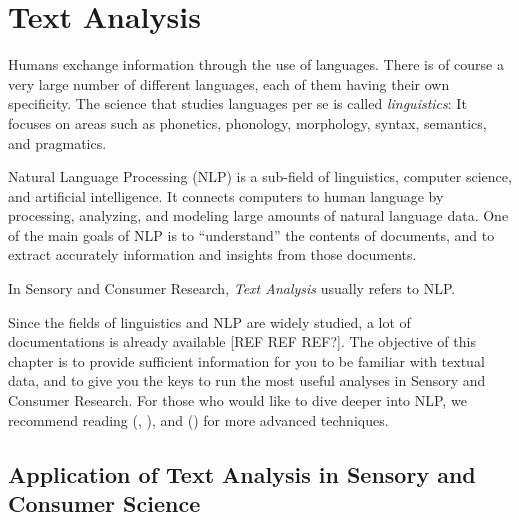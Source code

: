 \documentclass[
]{book}
\newenvironment{Shaded}{\begin{snugshade}}{\end{snugshade}}
\newcommand{\AttributeTok}[1]{\textcolor[rgb]{0.77,0.63,0.00}{#1}}
\newcommand{\CommentTok}[1]{\textcolor[rgb]{0.56,0.35,0.01}{\textit{#1}}}
\newcommand{\DecValTok}[1]{\textcolor[rgb]{0.00,0.00,0.81}{#1}}
\newcommand{\FunctionTok}[1]{\textcolor[rgb]{0.00,0.00,0.00}{#1}}
\newcommand{\NormalTok}[1]{#1}
\newcommand{\OtherTok}[1]{\textcolor[rgb]{0.56,0.35,0.01}{#1}}
\newcommand{\SpecialCharTok}[1]{\textcolor[rgb]{0.00,0.00,0.00}{#1}}
\newcommand{\StringTok}[1]{\textcolor[rgb]{0.31,0.60,0.02}{#1}}
\begin{document}
\begin{Shaded}
\end{Shaded}

\hypertarget{text-analysis}{%
\chapter{Text Analysis}\label{text-analysis}}

Humans exchange information through the use of languages. There is of course a very large number of different languages, each of them having their own specificity. The science that studies languages per se is called \emph{linguistics}: It focuses on areas such as phonetics, phonology, morphology, syntax, semantics, and pragmatics.

Natural Language Processing (NLP) is a sub-field of linguistics, computer science, and artificial intelligence. It connects computers to human language by processing, analyzing, and modeling large amounts of natural language data. One of the main goals of NLP is to ``understand'' the contents of documents, and to extract accurately information and insights from those documents.

In Sensory and Consumer Research, \emph{Text Analysis} usually refers to NLP.

Since the fields of linguistics and NLP are widely studied, a lot of documentations is already available {[}REF REF REF?{]}.
The objective of this chapter is to provide sufficient information for you to be familiar with textual data, and to give you the keys to run the most useful analyses in Sensory and Consumer Research. For those who would like to dive deeper into NLP, we recommend reading (\citet{Silge2017}, \citet{Becue-Bertaut2019}), and (\citet{Hvitfeldt2021}) for more advanced techniques.

\hypertarget{application-of-text-analysis-in-sensory-and-consumer-science}{%
\section{Application of Text Analysis in Sensory and Consumer Science}\label{application-of-text-analysis-in-sensory-and-consumer-science}}
\end{document}
